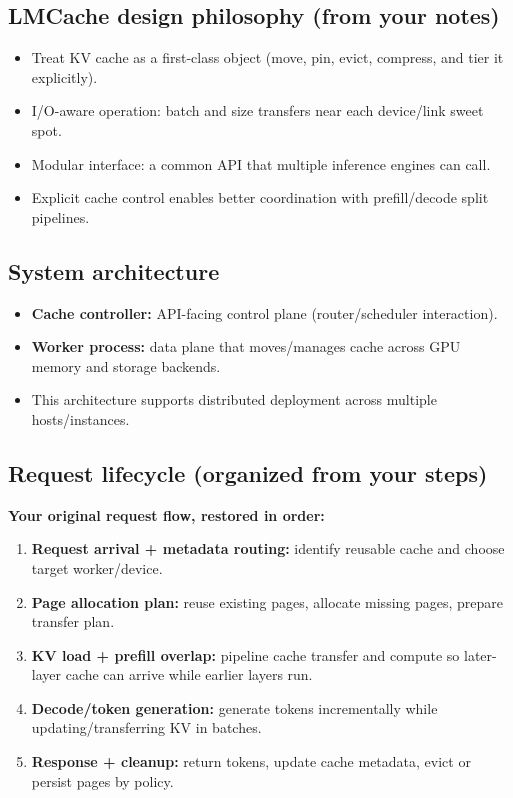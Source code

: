 \documentclass[11pt]{article}
\begin{document}
\subsection{LMCache design philosophy (from your notes)}
\begin{itemize}[leftmargin=1.2em]
\item Treat KV cache as a first-class object (move, pin, evict, compress, and tier it explicitly).
\item I/O-aware operation: batch and size transfers near each device/link sweet spot.
\item Modular interface: a common API that multiple inference engines can call.
\item Explicit cache control enables better coordination with prefill/decode split pipelines.
\end{itemize}

\subsection{System architecture}
\begin{itemize}[leftmargin=1.2em]
\item \textbf{Cache controller:} API-facing control plane (router/scheduler interaction).
\item \textbf{Worker process:} data plane that moves/manages cache across GPU memory and storage backends.
\item This architecture supports distributed deployment across multiple hosts/instances.
\end{itemize}

\subsection{Request lifecycle (organized from your steps)}
\textbf{Your original request flow, restored in order:}
\begin{enumerate}[leftmargin=1.3em]
\item \textbf{Request arrival + metadata routing:} identify reusable cache and choose target worker/device.
\item \textbf{Page allocation plan:} reuse existing pages, allocate missing pages, prepare transfer plan.
\item \textbf{KV load + prefill overlap:} pipeline cache transfer and compute so later-layer cache can arrive while earlier layers run.
\item \textbf{Decode/token generation:} generate tokens incrementally while updating/transferring KV in batches.
\item \textbf{Response + cleanup:} return tokens, update cache metadata, evict or persist pages by policy.
\end{enumerate}
\end{document}
